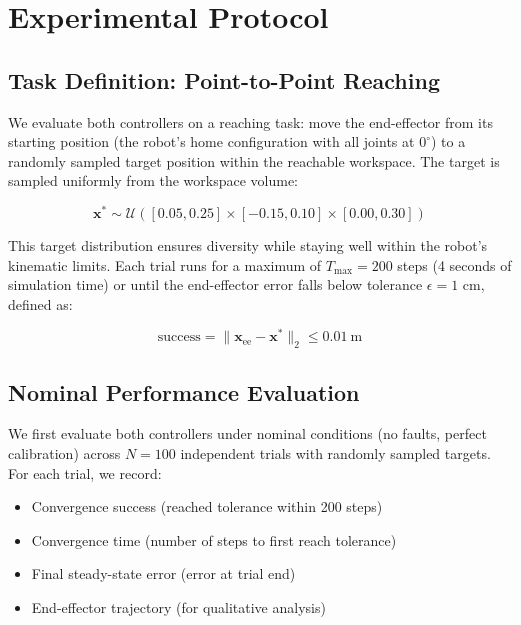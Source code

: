 \documentclass[12pt,a4paper,oneside]{report}
\begin{document}
\section{Experimental Protocol}

\subsection{Task Definition: Point-to-Point Reaching}

We evaluate both controllers on a reaching task: move the end-effector from its starting position (the robot's home configuration with all joints at $0^\circ$) to a randomly sampled target position within the reachable workspace. The target is sampled uniformly from the workspace volume:

\begin{equation}
\mathbf{x}^* \sim \mathcal{U}([0.05, 0.25] \times [-0.15, 0.10] \times [0.00, 0.30])
\end{equation}

This target distribution ensures diversity while staying well within the robot's kinematic limits. Each trial runs for a maximum of $T_{\text{max}} = 200$ steps (4 seconds of simulation time) or until the end-effector error falls below tolerance $\epsilon = 1$ cm, defined as:

\begin{equation}
\text{success} = \|\mathbf{x}_{\text{ee}} - \mathbf{x}^*\|_2 \leq 0.01\ \text{m}
\end{equation}

\subsection{Nominal Performance Evaluation}

We first evaluate both controllers under nominal conditions (no faults, perfect calibration) across $N = 100$ independent trials with randomly sampled targets. For each trial, we record:

\begin{itemize}
    \item Convergence success (reached tolerance within 200 steps)
    \item Convergence time (number of steps to first reach tolerance)
    \item Final steady-state error (error at trial end)
    \item End-effector trajectory (for qualitative analysis)
\end{itemize}
\end{document}
